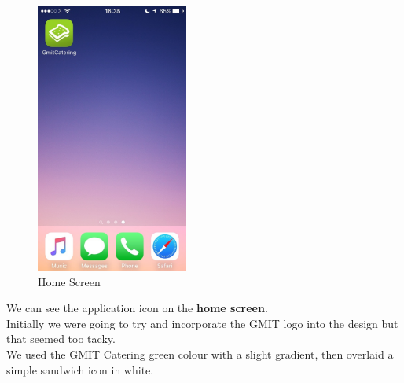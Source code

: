 \begin{minipage}{5cm}
	\begin{figure}[H]
		\includegraphics[width=5cm]{img/mobile-app/screen-shots/IMG_2903.jpg}
		\caption{Home Screen}
	\end{figure}
\end{minipage} \hfill
\begin{minipage}{0.55\textwidth}
We can see the application icon on the \textbf{home screen}.
\\

Initially we were going to try and incorporate the GMIT logo into the design but that seemed too tacky.
\\

We used the GMIT Catering green colour with a slight gradient, then overlaid a simple sandwich icon in white.
\end{minipage}


